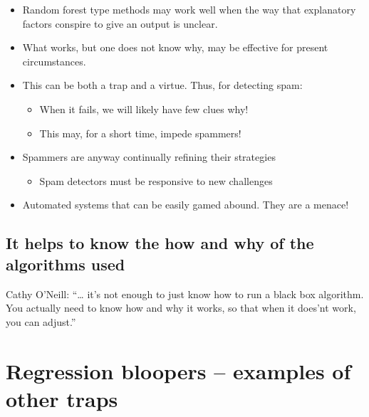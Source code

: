 \documentclass[
  10pt,
  b5paper]{book}
\providecommand{\tightlist}{%
  \setlength{\itemsep}{0pt}\setlength{\parskip}{0pt}}
\begin{document}
\begin{itemize}
\tightlist
\item
  Random forest type methods may work well when the way that
  explanatory factors conspire to give an output is unclear.
\item
  What works, but one does not know why, may be effective for
  present circumstances.
\item
  This can be both a trap and a virtue. Thus, for detecting spam:

  \begin{itemize}
  \tightlist
  \item
    When it fails, we will likely have few clues why!
  \item
    This may, for a short time, impede spammers!
  \end{itemize}
\item
  Spammers are anyway continually refining their strategies

  \begin{itemize}
  \tightlist
  \item
    Spam detectors must be responsive to new challenges
  \end{itemize}
\item
  Automated systems that can be easily gamed abound. They are a
  menace!
\end{itemize}

\hypertarget{it-helps-to-know-the-how-and-why-of-the-algorithms-used}{%
\subsection*{It helps to know the how and why of the algorithms used}\label{it-helps-to-know-the-how-and-why-of-the-algorithms-used}}

Cathy O'Neill: ``\ldots{} it's not enough to just know how to run a black box
algorithm. You actually need to know how and why it works, so that when
it does'nt work, you can adjust.''

\hypertarget{regression-bloopers-examples-of-other-traps}{%
\section{Regression bloopers -- examples of other traps}\label{regression-bloopers-examples-of-other-traps}}

\vspace*{-5pt}
\end{document}
